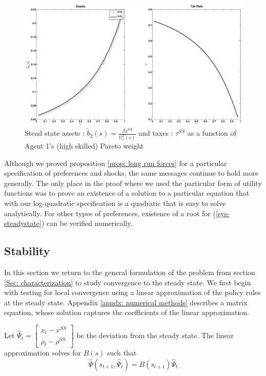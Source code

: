 \documentclass[thmsb,11pt]{article}
\newcommand{\bmat}{\begin{matrix}}
\newcommand{\emat}{\end{matrix}}
\begin{document}
  \begin{figure}[htp]
 \centering
 \includegraphics[width=\textwidth]{Draft25Graphs/SS_alpha1.eps}
 \caption{ Stead state assets : $\tilde{b}_2(s)=\frac{\beta  x^{SS}}{U^2_c(s)}$ and taxes : $\tau^{SS}$ as a function of Agent 1's (high skilled) Pareto weight}
 \label{fig: SS comparative}
 \end{figure}


Although we proved proposition \ref{prop: long run forces} for a particular
specification of preferences and shocks, the same  messages continue to hold more
generally.  The only place in the proof where we used the particular form of utility functions  was to prove an existence of a
solution to a particular equation that with our log-quadratic specification is  a quadratic that is
easy to solve analytically.  For other types of preferences, existence of a root for (\ref{sys-steadystate}) 
can be verified numerically. 

\subsection{Stability}
In this section we return to the general formulation of the problem from section \ref{Sec: characterization} to study convergence to the steady state. We first begin with testing for local convergence using a linear approximation of the policy rules at the steady state. Appendix \ref{apndx: numerical methods} describes a matrix equation, whose solution captures the coefficients of the linear approximation. 

Let $\hat{\Psi}_{t}= \left[\bmat x_{t} - x^{SS}\\ \rho_t - \rho^{SS}\emat\right]$ be the deviation from the steady state. The linear approximation solves for $B(s)$ such that
\begin{equation}
 \hat{\Psi}(s_{t+1},\hat{\Psi}_t)=B(s_{t+1})\hat{\Psi}_t \label{eq.linear.lom}
\end{equation}
\end{document}
